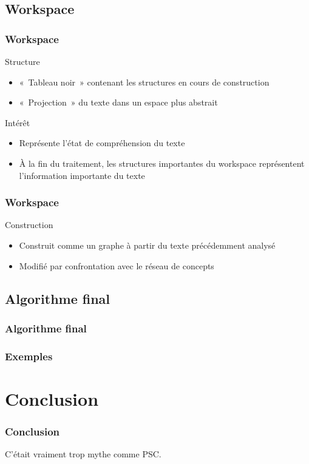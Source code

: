 \documentclass[12pt, handout]{beamer}
\begin{document}
\subsection{Workspace}

\begin{frame}
  \frametitle{Workspace}

  \begin{block}{Structure}
    \begin{itemize}
      \item «~Tableau noir~» contenant les structures en cours de construction
      \item «~Projection~» du texte dans un espace plus abstrait
    \end{itemize}
  \end{block}
  \begin{block}{Intérêt}
    \begin{itemize}
      \item Représente l'état de compréhension du texte
      \item À la fin du traitement, les structures importantes du workspace représentent l'information importante du texte
    \end{itemize}
  \end{block}

\end{frame}

\begin{frame}
  \frametitle{Workspace}
 
  \begin{block}{Construction}
    \begin{itemize}
      \item Construit comme un graphe à partir du texte précédemment analysé
      \item Modifié par confrontation avec le réseau de concepts
    \end{itemize}
  \end{block}
 
\end{frame}

\subsection{Algorithme final}

\begin{frame}
 \frametitle{Algorithme final}
 
 
\end{frame}

\begin{frame}
 \frametitle{Exemples}
 
 
\end{frame}

\section{Conclusion}

\begin{frame}
 \frametitle{Conclusion}
 
C'était vraiment trop mythe comme PSC\@.
 
\end{frame}
\end{document}
